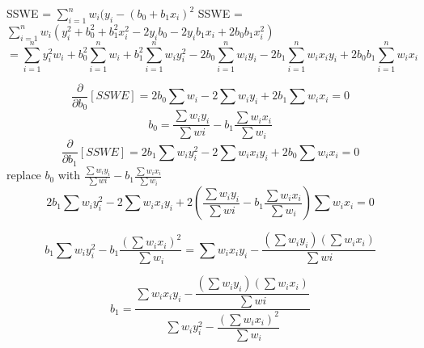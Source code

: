 \documentclass[12pt]{article}
\begin{document}
\begin{enumerate}
SSWE = $\sum_{i=1}^n w_i(y_i -(b_0 +b_1 x_i)^2$ \newline
SSWE = $\sum_{i=1}^n w_i(y_i^2 +b_0^2 +b_1^2 x_i^2 -2y_i b_0 -2y_i b_1 x_i +2b_0 b_1 x_i^2)$
$$= \sum_{i =1}^n y_i^2 w_i + b_0^2 \sum_{i=1}^n w_i + b_1^2 \sum_{i=1}^n w_i y_i^2 - 2b_0 \sum_{i=1}^n w_i y_i -2b_1\sum_{i=1}^n w_i x_i y_i +2b_0 b_1 \sum_{i=1}^n w_i x_i$$

$$ \frac{\partial }{\partial b_0}[SSWE] = 2b_0\sum w_i -2 \sum w_i y_i +2b_1 \sum w_i x_i = 0 $$
$$b_0 = \frac{\sum w_i y_i}{\sum{wi}} - b_1\frac{\sum w_i x_i}{\sum w_i}$$
$$\frac{\partial }{\partial b_1}[SSWE] = 2b_1 \sum w_i y_i^2 -2 \sum w_i x_i y_i +2b_0 \sum w_i x_i = 0  $$ \newline 
replace $b_0$ with $\frac{\sum w_i y_i}{\sum{wi}} - b_1\frac{\sum w_i x_i}{\sum w_i}$ \newline
$$ 2b_1 \sum w_i y_i^2 -2 \sum w_i x_i y_i +2(\frac{\sum w_i y_i}{\sum{wi}} - b_1\frac{\sum w_i x_i}{\sum w_i}) \sum w_i x_i = 0$$

$$b_1 \sum w_i y_i^2  - b_1\frac{(\sum w_i x_i)^2}{\sum w_i}  =  \sum w_i x_i y_i - \frac{(\sum w_i y_i)(\sum w_i x_i)}{\sum{wi}}$$

$$b_1 = \dfrac{ \sum w_i x_i y_i - \dfrac{(\sum w_i y_i)(\sum w_i x_i)}{\sum{wi}}}{ \sum w_i y_i^2  -\dfrac{(\sum w_i x_i)^2}{\sum w_i}  }$$ \quad




\end{enumerate}
\end{document}
